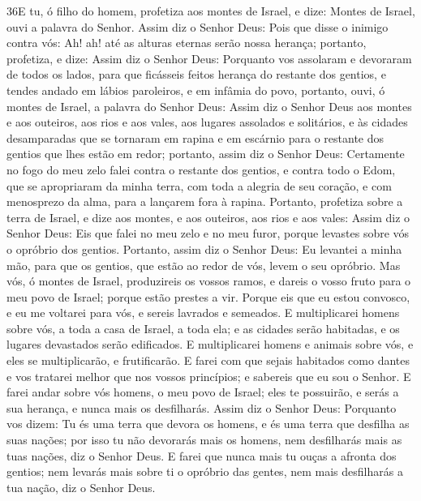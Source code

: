 \lettrine{36} E tu, ó filho do homem, profetiza aos montes de
Israel, e dize: Montes de Israel, ouvi a palavra do Senhor.
Assim diz o Senhor Deus: Pois que disse o inimigo contra vós:
Ah! ah! até as alturas eternas serão nossa herança; portanto,
profetiza, e dize: Assim diz o Senhor Deus: Porquanto vos assolaram
e devoraram de todos os lados, para que ficásseis feitos herança do
restante dos gentios, e tendes andado em lábios paroleiros, e em
infâmia do povo, portanto, ouvi, ó montes de Israel, a palavra
do Senhor Deus: Assim diz o Senhor Deus aos montes e aos outeiros,
aos rios e aos vales, aos lugares assolados e solitários, e às
cidades desamparadas que se tornaram em rapina e em escárnio para o
restante dos gentios que lhes estão em redor; portanto, assim
diz o Senhor Deus: Certamente no fogo do meu zelo falei contra o
restante dos gentios, e contra todo o Edom, que se apropriaram da
minha terra, com toda a alegria de seu coração, e com menosprezo da
alma, para a lançarem fora à rapina. Portanto, profetiza sobre a
terra de Israel, e dize aos montes, e aos outeiros, aos rios e aos
vales: Assim diz o Senhor Deus: Eis que falei no meu zelo e no meu
furor, porque levastes sobre vós o opróbrio dos gentios.
Portanto, assim diz o Senhor Deus: Eu levantei a minha mão, para
que os gentios, que estão ao redor de vós, levem o seu opróbrio.
Mas vós, ó montes de Israel, produzireis os vossos ramos, e
dareis o vosso fruto para o meu povo de Israel; porque estão prestes
a vir. Porque eis que eu estou convosco, e eu me voltarei para
vós, e sereis lavrados e semeados. E multiplicarei homens
sobre vós, a toda a casa de Israel, a toda ela; e as cidades serão
habitadas, e os lugares devastados serão edificados. E
multiplicarei homens e animais sobre vós, e eles se multiplicarão, e
frutificarão. E farei com que sejais habitados como dantes e vos
tratarei melhor que nos vossos princípios; e sabereis que eu sou o
Senhor. E farei andar sobre vós homens, o meu povo de Israel;
eles te possuirão, e serás a sua herança, e nunca mais os
desfilharás. Assim diz o Senhor Deus: Porquanto vos dizem: Tu
és uma terra que devora os homens, e és uma terra que desfilha as
suas nações; por isso tu não devorarás mais os homens, nem
desfilharás mais as tuas nações, diz o Senhor Deus. E farei
que nunca mais tu ouças a afronta dos gentios; nem levarás mais
sobre ti o opróbrio das gentes, nem mais desfilharás a tua nação,
diz o Senhor Deus.

